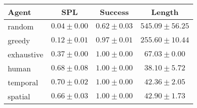 \begin{tabular}{lccc}
    \toprule
    Agent & SPL & Success & Length \\
    \midrule
    random & $0.04 \pm 0.00$ & $0.62 \pm 0.03$ & $545.09 \pm 56.25$\\
    greedy & $0.12 \pm 0.01$ & $0.97 \pm 0.01$ & $255.60 \pm 10.44$\\
    exhaustive & $0.37 \pm 0.00$ & $1.00 \pm 0.00$ & $67.03 \pm 0.00$\\
    human & $0.68 \pm 0.08$ & $1.00 \pm 0.00$ & $38.10 \pm 5.72$\\
    \midrule
    temporal & $0.70 \pm 0.02$ & $1.00 \pm 0.00$ & $42.36 \pm 2.05$\\
    spatial & $0.66 \pm 0.03$ & $1.00 \pm 0.00$ & $42.90 \pm 1.73$\\
    \bottomrule
\end{tabular}